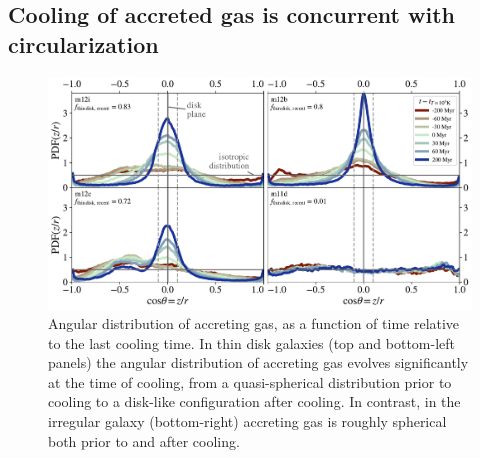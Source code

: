 \documentclass[fleqn,usenatbib]{mnras}
\newcommand{\Rcon}{R_{T=10^5\,{\rm K}}}
\begin{document}


\subsection{Cooling of accreted gas is concurrent with circularization}
\label{s: characteristics -- aligns}

\begin{figure}
    \centering
    \includegraphics[width=\textwidth]{figures/theta_vs_t.pdf}
    \caption{
    Angular distribution of accreting gas, as a function of time relative to the last cooling time.
    In thin disk galaxies (top and bottom-left panels) the angular distribution of accreting gas evolves significantly at the time of cooling, from a quasi-spherical distribution prior to cooling to a disk-like configuration after cooling. 
    In contrast, in the irregular galaxy (bottom-right) accreting gas is roughly spherical both prior to and after cooling.
    }
    \label{f: theta vs t}
\end{figure}
\end{document}
